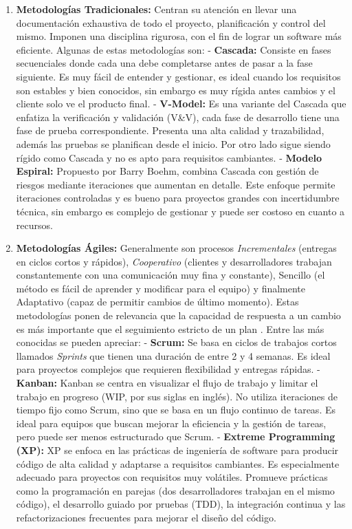 \begin{enumerate}
    \item[1-] \textbf{Metodolog\'ias Tradicionales:} Centran su atenci\'on en llevar una documentaci\'on exhaustiva de todo el proyecto, planificaci\'on y control del mismo. Imponen una disciplina rigurosa, con el fin de lograr un software m\'as eficiente. Algunas de estas metodolog\'ias son:
    - \textbf{Cascada:} Consiste en fases secuenciales donde cada una debe completarse antes de pasar a la fase siguiente. Es muy f\'acil de entender y gestionar, es ideal cuando los requisitos son estables y bien conocidos, sin embargo es muy r\'igida antes cambios y el cliente solo ve el producto final.
    - \textbf{V-Model:} Es una variante del Cascada que enfatiza la verificaci\'on y validaci\'on (V\&V), cada fase de desarrollo tiene una fase de prueba correspondiente. Presenta una alta calidad y trazabilidad, adem\'as las pruebas se planifican desde el inicio. Por otro lado sigue siendo r\'igido como Cascada y no es apto para requisitos cambiantes.
    - \textbf{Modelo Espiral:} Propuesto por Barry Boehm, combina Cascada con gestión de riesgos mediante iteraciones que aumentan en detalle. Este enfoque permite iteraciones controladas y es bueno para proyectos grandes con incertidumbre t\'ecnica, sin embargo es complejo de gestionar y puede ser costoso en cuanto a recursos.

    \item[2-] \textbf{Metodolog\'ias \'Agiles:} Generalmente son procesos \textit{Incrementales} (entregas en ciclos cortos y r\'apidos), \textit{Cooperativo} (clientes y desarrolladores trabajan constantemente con una comunicación muy fina y constante), Sencillo (el método es fácil de aprender y modificar para el equipo) y finalmente Adaptativo (capaz de permitir cambios de último momento). Estas metodologías ponen de relevancia que la capacidad de respuesta a un cambio es más importante que el seguimiento estricto de un plan \cite{metodologiasAgiles}. Entre las m\'as conocidas se pueden apreciar:
    - \textbf{Scrum:} Se basa en ciclos de trabajos cortos llamados \textit{Sprints} que tienen una duraci\'on de entre 2 y 4 semanas. Es ideal para proyectos complejos que requieren flexibilidad y entregas r\'apidas. \cite{scrumAbstract}
    - \textbf{Kanban:} Kanban se centra en visualizar el flujo de trabajo y limitar el trabajo en progreso (WIP, por sus siglas en inglés). No utiliza iteraciones de tiempo fijo como Scrum, sino que se basa en un flujo continuo de tareas. Es ideal para equipos que buscan mejorar la eficiencia y la gestión de tareas, pero puede ser menos estructurado que Scrum.
    - \textbf{Extreme Programming (XP):} XP se enfoca en las prácticas de ingeniería de software para producir código de alta calidad y adaptarse a requisitos cambiantes. Es especialmente adecuado para proyectos con requisitos muy volátiles. Promueve prácticas como la programación en parejas (dos desarrolladores trabajan en el mismo código), el desarrollo guiado por pruebas (TDD), la integración continua y las refactorizaciones frecuentes para mejorar el diseño del código. 
\end{enumerate}

